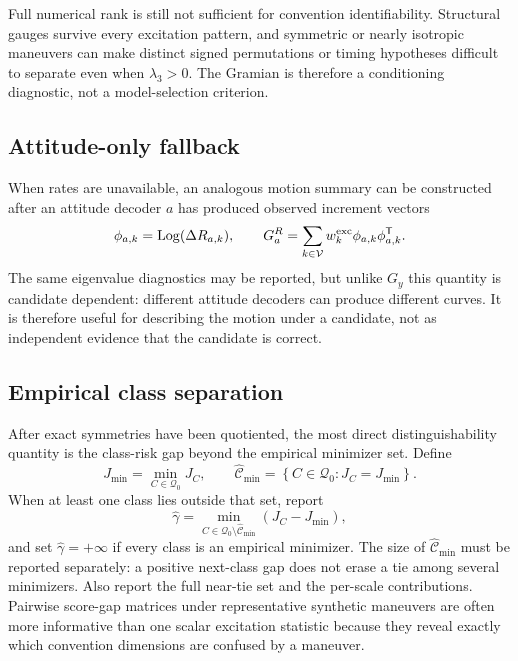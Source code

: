 \documentclass[11pt]{article}
\newcommand{\Log}{\operatorname{Log}}
\newcommand{\set}[1]{\left\{ #1 \right\}}
\begin{document}
    Full numerical rank is still not sufficient for convention identifiability. Structural
    gauges survive every excitation pattern, and symmetric or nearly isotropic maneuvers can
    make distinct signed permutations or timing hypotheses difficult to separate even when
    $\lambda_3>0$. The Gramian is therefore a conditioning diagnostic, not a model-selection
    criterion.

    \subsection{Attitude-only fallback}

    When rates are unavailable, an analogous motion summary can be constructed after an
    attitude decoder $a$ has produced observed increment vectors
    \begin{equation}
        \phi_{a,k}=\Log(\Delta R_{a,k}),
        \qquad
        G^{R}_a=\sum_{k\in\mathcal V}w_k^{\rm exc}
        \phi_{a,k}\phi_{a,k}^{\mathsf T}.
        \label{eq:attitude-increment-gramian}
    \end{equation}
    The same eigenvalue diagnostics may be reported, but unlike $G_y$ this quantity is
    candidate dependent: different attitude decoders can produce different curves. It is
    therefore useful for describing the motion under a candidate, not as independent evidence
    that the candidate is correct.

    \subsection{Empirical class separation}

    After exact symmetries have been quotiented, the most direct distinguishability quantity
    is the class-risk gap beyond the empirical minimizer set. Define
    \begin{equation}
        J_{\min}=\min_{C\in\mathcal Q_0}J_C,
        \qquad
        \widehat{\mathcal C}_{\min}
        =\set{C\in\mathcal Q_0:J_C=J_{\min}}.
    \end{equation}
    When at least one class lies outside that set, report
    \begin{equation}
        \widehat\gamma
        =\min_{C\in\mathcal Q_0\setminus\widehat{\mathcal C}_{\min}}
        \left(J_C-J_{\min}\right),
        \label{eq:empirical-class-gap}
    \end{equation}
    and set $\widehat\gamma=+\infty$ if every class is an empirical minimizer. The size of
    $\widehat{\mathcal C}_{\min}$ must be reported separately: a positive next-class gap does
    not erase a tie among several minimizers. Also report the full near-tie set and the
    per-scale contributions. Pairwise score-gap
    matrices under representative synthetic maneuvers are often more informative than one
    scalar excitation statistic because they reveal exactly which convention dimensions are
    confused by a maneuver.
\end{document}
